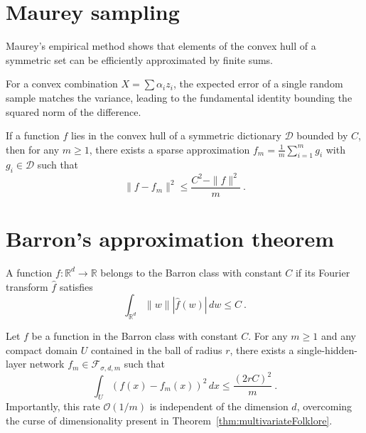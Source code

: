 \section{Maurey sampling}\label{sec:maureySampling}

Maurey's empirical method shows that elements of the convex hull of a symmetric set can be efficiently approximated by finite sums.

\begin{lemma}\label{lem:barycenterProps}
For a convex combination $X = \sum \alpha_i z_i$, the expected error of a single random sample matches the variance, leading to the fundamental identity bounding the squared norm of the difference.
\end{lemma}

\begin{theorem}\label{thm:maureySampling}
If a function $f$ lies in the convex hull of a symmetric dictionary $\mathcal{D}$ bounded by $C$, then for any $m \ge 1$, there exists a sparse approximation $f_m = \frac{1}{m} \sum_{i=1}^m g_i$ with $g_i \in \mathcal{D}$ such that
\[
  \|f - f_m\|^2 \le \frac{C^2 - \|f\|^2}{m}
  \: .
\]
\end{theorem}

\section{Barron's approximation theorem}\label{sec:barron}

\begin{definition}\label{def:barronClass}
A function $f : \mathbb{R}^d \to \mathbb{R}$ belongs to the Barron class with constant $C$ if its Fourier transform $\hat{f}$ satisfies
\[
  \int_{\mathbb{R}^d} \|w\| |\hat{f}(w)| \, dw \le C
  \: .
\]
\end{definition}

\begin{theorem}\label{thm:barronTheorem}
Let $f$ be a function in the Barron class with constant $C$. For any $m \ge 1$ and any compact domain $U$ contained in the ball of radius $r$, there exists a single-hidden-layer network $f_m \in \mathcal{F}_{\sigma, d, m}$ such that
\[
  \int_U (f(x) - f_m(x))^2 \, dx \le \frac{(2rC)^2}{m}
  \: .
\]
Importantly, this rate $\mathcal{O}(1/m)$ is independent of the dimension $d$, overcoming the curse of dimensionality present in Theorem~\ref{thm:multivariateFolklore}.
\end{theorem}
